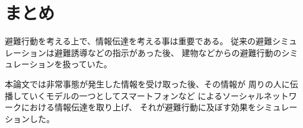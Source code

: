 \documentclass[a4j]{jarticle}
\begin{document}
\section{まとめ}
避難行動を考える上で、情報伝達を考える事は重要である。
従来の避難シミュレーションは避難誘導などの指示があった後、
建物などからの避難行動のシミュレーションを扱っていた。

本論文では非常事態が発生した情報を受け取った後、その情報が
周りの人に伝播していくモデルの一つとしてスマートフォンなど
によるソーシャルネットワークにおける情報伝達を取り上げ、
それが避難行動に及ぼす効果をシミュレーションした。






\end{document}

